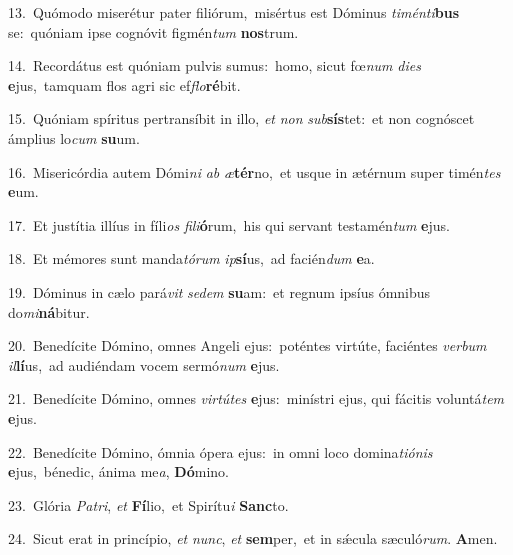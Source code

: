 {\numbfont\textcolor{\numbcolor}{13.}}~Quómodo miserétur pater filiórum,~\dagger misértus est Dóminus \textit{ti}\-\textit{mén}\textit{ti}\textbf{bus} se:~\star quóniam ipse cognóvit figmén\textit{tum} \textbf{nos}\-trum.\par
{\numbfont\textcolor{\numbcolor}{14.}}~Recordátus est quóniam pulvis sumus:~\dagger homo, sicut fœ\textit{num} \textit{di}\-\textit{es} \textbf{e}\-jus,~\star tamquam flos agri sic ef\-\textit{flo}\-\textbf{ré}bit.\par
{\numbfont\textcolor{\numbcolor}{15.}}~Quóniam spíritus pertransíbit in illo, \textit{et} \textit{non} \textit{sub}\-\textbf{sís}tet:~\star et non cognóscet ámplius lo\textit{cum} \textbf{su}\-um.\par
{\numbfont\textcolor{\numbcolor}{16.}}~Misericórdia autem Dómi\textit{ni} \textit{ab} \textit{æ}\-\textbf{tér}no,~\star et usque in ætérnum super timén\textit{tes} \textbf{e}\-um.\par
{\numbfont\textcolor{\numbcolor}{17.}}~Et justítia illíus in fíli\textit{os} \textit{fi}\-\textit{li}\textbf{ó}rum,~\star his qui servant testamén\textit{tum} \textbf{e}\-jus.\par
{\numbfont\textcolor{\numbcolor}{18.}}~Et mémores sunt manda\-\textit{tó}\-\textit{rum} \textit{ip}\-\textbf{sí}us,~\star ad facién\textit{dum} \textbf{e}\-a.\par
{\numbfont\textcolor{\numbcolor}{19.}}~Dóminus in cælo pará\textit{vit} \textit{se}\-\textit{dem} \textbf{su}\-am:~\star et regnum ipsíus ómnibus do\-\textit{mi}\-\textbf{ná}bitur.\par
{\numbfont\textcolor{\numbcolor}{20.}}~Benedícite Dómino, omnes Angeli ejus:~\dagger poténtes virtúte, faciéntes \textit{ver}\-\textit{bum} \textit{il}\-\textbf{lí}us,~\star ad audiéndam vocem sermó\textit{num} \textbf{e}\-jus.\par
{\numbfont\textcolor{\numbcolor}{21.}}~Benedícite Dómino, omnes \textit{vir}\-\textit{tú}\textit{tes} \textbf{e}\-jus:~\star minístri ejus, qui fácitis voluntá\textit{tem} \textbf{e}\-jus.\par
{\numbfont\textcolor{\numbcolor}{22.}}~Benedícite Dómino, ómnia ópera ejus:~\dagger in omni loco domina\-\textit{ti}\-\textit{ó}\textit{nis} \textbf{e}\-jus,~\star bénedic, ánima me\-\textit{a}\-, \textbf{Dó}\-mino.\par
{\numbfont\textcolor{\numbcolor}{23.}}~Glória \textit{Pa}\-\textit{tri}, \textit{et} \textbf{Fí}\-lio,~\star et Spirítu\textit{i} \textbf{Sanc}\-to.\par
{\numbfont\textcolor{\numbcolor}{24.}}~Sicut erat in princípio, \textit{et} \textit{nunc}\-, \textit{et} \textbf{sem}\-per,~\star et in sǽcula sæculó\-\textit{rum}\-. \textbf{A}\-men.\par
